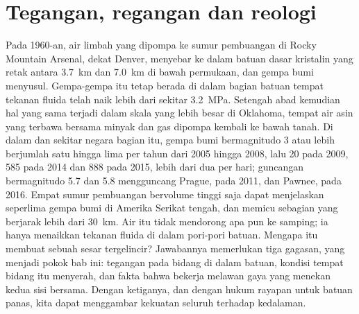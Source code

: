 \chapter{Tegangan, regangan dan reologi}\label{ch:b1:stress-strain-rheology}

Pada 1960-an, air limbah yang dipompa ke sumur pembuangan di Rocky Mountain Arsenal, dekat Denver, menyebar ke dalam batuan dasar kristalin yang retak antara \qty{3.7}{km} dan \qty{7.0}{km} di bawah permukaan, dan gempa bumi menyusul. Gempa-gempa itu tetap berada di dalam bagian batuan tempat tekanan fluida telah naik lebih dari sekitar \qty{3.2}{MPa}.
Setengah abad kemudian hal yang sama terjadi dalam skala yang lebih besar di Oklahoma, tempat air asin yang terbawa bersama minyak dan gas dipompa kembali ke bawah tanah. Di dalam dan sekitar negara bagian itu, gempa bumi bermagnitudo 3 atau lebih berjumlah satu hingga lima per tahun dari 2005 hingga 2008, lalu \num{20} pada 2009, \num{585} pada 2014 dan \num{888} pada 2015, lebih dari dua per hari; guncangan bermagnitudo 5.7 dan 5.8 mengguncang Prague, pada 2011, dan Pawnee, pada 2016. Empat sumur pembuangan bervolume tinggi saja dapat menjelaskan seperlima gempa bumi di Amerika Serikat tengah, dan memicu sebagian yang berjarak lebih dari \qty{30}{km}.
Air itu tidak mendorong apa pun ke samping; ia hanya menaikkan tekanan fluida di dalam pori-pori batuan. Mengapa itu membuat sebuah sesar tergelincir? Jawabannya memerlukan tiga gagasan, yang menjadi pokok bab ini: tegangan pada bidang di dalam batuan, kondisi tempat bidang itu menyerah, dan fakta bahwa  bekerja melawan gaya yang menekan kedua sisi bersama. Dengan ketiganya, dan dengan hukum rayapan untuk batuan panas, kita dapat menggambar kekuatan seluruh  terhadap kedalaman.

